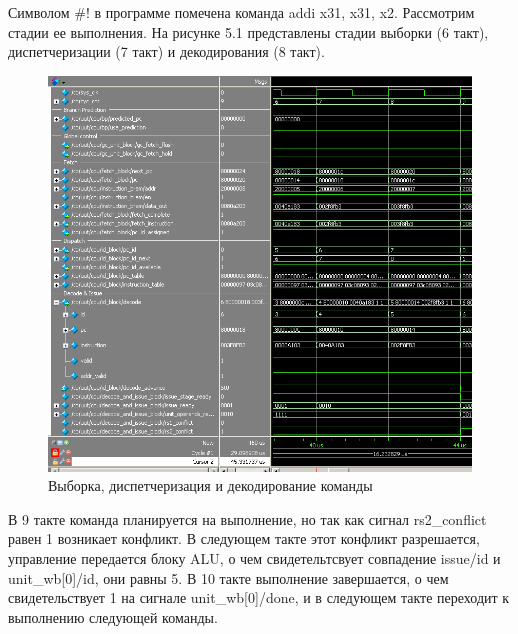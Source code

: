 Символом \#! в программе помечена команда addi x31, x31, x2. Рассмотрим стадии ее выполнения. На рисунке 5.1 представлены стадии выборки (6 такт), диспетчеризации (7 такт) и декодирования (8 такт).

\begin{figure}[h!]
	\begin{center}
		\includegraphics[scale=0.6]{assets/80000014.1.png}
	\end{center}
	\caption{Выборка, диспетчеризация и декодирование команды}
\end{figure}

В 9 такте команда планируется на выполнение, но так как сигнал rs2\_conflict равен 1 возникает конфликт. В следующем такте этот конфликт разрешается, управление передается блоку ALU, о чем свидетельтсвует совпадение issue/id и unit\_wb[0]/id, они равны 5. В 10 такте выполнение завершается, о чем свидетельствует 1 на сигнале unit\_wb[0]/done, и в следующем такте переходит к выполнению следующей команды.

